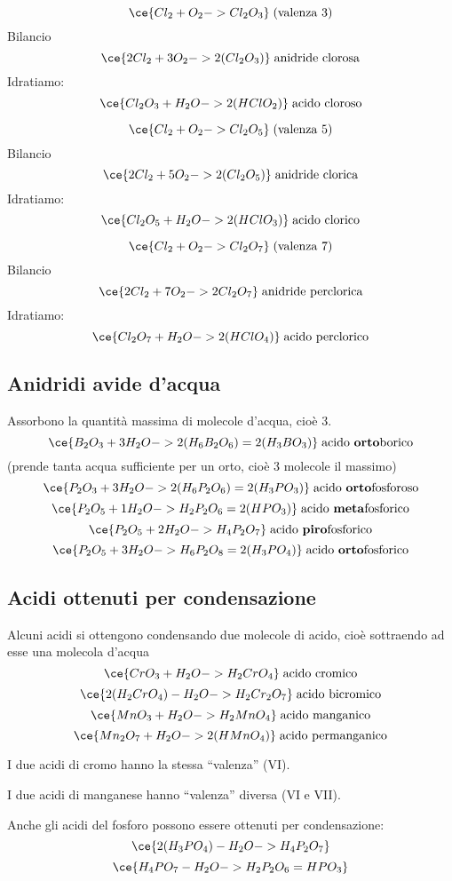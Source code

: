$$\ce{Cl_2 + O_2 -> Cl_2O_3} \; \text{(valenza 3)}$$ Bilancio
$$\ce{2 Cl_2 + 3 O_2 -> 2 (Cl_2O_3)} \; \text{anidride clorosa}$$
Idratiamo:
$$\ce{Cl_2O_3 + H_2O -> 2 (HClO_2) } \; \text{acido cloroso}$$

$$\ce{Cl_2 + O_2 -> Cl_2O_5} \; \text{(valenza 5)}$$ Bilancio
$$\ce{2 Cl_2 + 5 O_2 -> 2 (Cl_2O_5)} \; \text{anidride clorica}$$
Idratiamo:
$$\ce{Cl_2O_5 + H_2O -> 2 (HClO_3)} \; \text{acido clorico}$$

$$\ce{Cl_2 + O_2 -> Cl_2O_7} \; \text{(valenza 7)}$$ Bilancio
$$\ce{2 Cl_2 + 7 O_2 -> 2 Cl_2O_7} \; \text{anidride perclorica}$$
Idratiamo:
$$\ce{Cl_2O_7 + H_2O -> 2 (HClO_4)} \; \text{acido perclorico}$$

\subsection{Anidridi avide d'acqua}
Assorbono la quantità massima di molecole d'acqua, cioè 3.
$$\ce{B_2O_3 + 3 H_2O -> 2 (H_6B_2O_6)= 2 (H_3BO_3)} \; \text{acido \textbf{orto}borico}$$\hspace{+1.2cm}(prende tanta acqua sufficiente per un orto, cioè 3 molecole il massimo)
$$\ce{P_2O_3 + 3  H_2O -> 2 (H_6P_2O_6)= 2 (H_3PO_3)} \; \text{acido \textbf{orto}fosforoso}$$
$$\ce{P_2O_5 + 1 H_2O -> H_2P_2O_6= 2 (HPO_3)} \; \text{acido \textbf{meta}fosforico}$$
$$\ce{P_2O_5 + 2 H_2O -> H_4P_2O_7} \; \text{acido \textbf{piro}fosforico}$$
$$\ce{P_2O_5 + 3 H_2O -> H_6P_2O_8 = 2 (H_3PO_4)} \; \text{acido \textbf{orto}fosforico}$$
\subsection{Acidi ottenuti per condensazione}
Alcuni acidi si ottengono condensando due molecole di acido, cioè sottraendo ad esse una molecola d'acqua
$$\ce{CrO_3 + H_2O -> H_2CrO_4} \; \text{acido cromico}$$
$$\ce{2 (H_2CrO_4)-H_2O -> H_2Cr_2O_7} \; \text{acido bicromico}$$
$$\ce{MnO_3 + H_2O -> H_2MnO_4} \; \text{acido manganico}$$
$$\ce{Mn_2O_7 + H_2O -> 2 (HMnO_4)} \; \text{acido permanganico}$$

I due acidi di cromo hanno la stessa “valenza” (VI).

I due acidi di manganese hanno “valenza” diversa (VI e VII).

Anche gli acidi del fosforo possono essere ottenuti per condensazione:
$$\ce{2 (H_3PO_4) - H_2O -> H_4P_2O_7}$$
$$\ce{H_4PO_7 - H_2O -> H_2P_2O_6=HPO_3}$$











